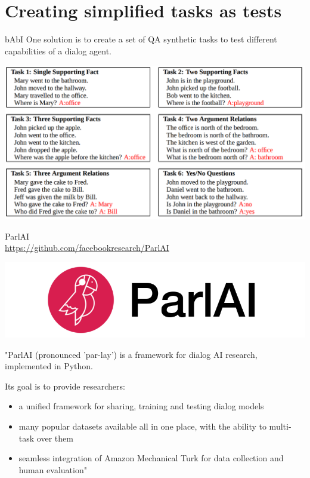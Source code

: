 \documentclass[10pt]{beamer}
\begin{document}
\section{Creating simplified tasks as tests}

\begin{frame}{bAbI \cite{WestonBCM15}}
One solution is to create a set of QA synthetic tasks to test different capabilities of a dialog agent.


\begin{center}
\includegraphics[scale=0.25]{images/babi.png}
\end{center}
\end{frame}



\begin{frame}{ParlAI \\ \url{https://github.com/facebookresearch/ParlAI}}

\begin{center}
\includegraphics[scale=0.84]{images/parlai.png}
\end{center}

"ParlAI (pronounced 'par-lay') is a framework for dialog AI research, implemented in Python.

Its goal is to provide researchers:

\begin{itemize}
\item a unified framework for sharing, training and testing dialog models
\item many popular datasets available all in one place, with the ability to multi-task over them
\item seamless integration of Amazon Mechanical Turk for data collection and human evaluation"
\end{itemize}

\end{frame}
\end{document}

